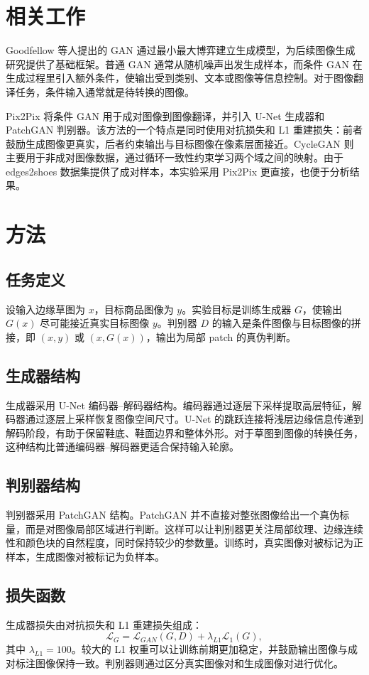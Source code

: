 \documentclass[UTF8,a4paper,twocolumn,10pt]{ctexart}
\begin{document}
\section{相关工作}
Goodfellow 等人提出的 GAN\cite{goodfellow2014gan} 通过最小最大博弈建立生成模型，为后续图像生成研究提供了基础框架。普通 GAN 通常从随机噪声出发生成样本，而条件 GAN 在生成过程里引入额外条件，使输出受到类别、文本或图像等信息控制。对于图像翻译任务，条件输入通常就是待转换的图像。

Pix2Pix\cite{isola2017pix2pix} 将条件 GAN 用于成对图像到图像翻译，并引入 U-Net 生成器和 PatchGAN 判别器。该方法的一个特点是同时使用对抗损失和 L1 重建损失：前者鼓励生成图像更真实，后者约束输出与目标图像在像素层面接近。CycleGAN\cite{zhu2017cyclegan} 则主要用于非成对图像数据，通过循环一致性约束学习两个域之间的映射。由于 edges2shoes 数据集提供了成对样本，本实验采用 Pix2Pix 更直接，也便于分析结果。

\section{方法}
\subsection{任务定义}
设输入边缘草图为 $x$，目标商品图像为 $y$。实验目标是训练生成器 $G$，使输出 $G(x)$ 尽可能接近真实目标图像 $y$。判别器 $D$ 的输入是条件图像与目标图像的拼接，即 $(x,y)$ 或 $(x,G(x))$，输出为局部 patch 的真伪判断。

\subsection{生成器结构}
生成器采用 U-Net 编码器--解码器结构。编码器通过逐层下采样提取高层特征，解码器通过逐层上采样恢复图像空间尺寸。U-Net 的跳跃连接将浅层边缘信息传递到解码阶段，有助于保留鞋底、鞋面边界和整体外形。对于草图到图像的转换任务，这种结构比普通编码器--解码器更适合保持输入轮廓。

\subsection{判别器结构}
判别器采用 PatchGAN 结构。PatchGAN 并不直接对整张图像给出一个真伪标量，而是对图像局部区域进行判断。这样可以让判别器更关注局部纹理、边缘连续性和颜色块的自然程度，同时保持较少的参数量。训练时，真实图像对被标记为正样本，生成图像对被标记为负样本。

\subsection{损失函数}
生成器损失由对抗损失和 L1 重建损失组成：
\begin{equation}
\mathcal{L}_{G}=\mathcal{L}_{GAN}(G,D)+\lambda_{L1}\mathcal{L}_{1}(G),
\end{equation}
其中 $\lambda_{L1}=100$。较大的 L1 权重可以让训练前期更加稳定，并鼓励输出图像与成对标注图像保持一致。判别器则通过区分真实图像对和生成图像对进行优化。
\end{document}
